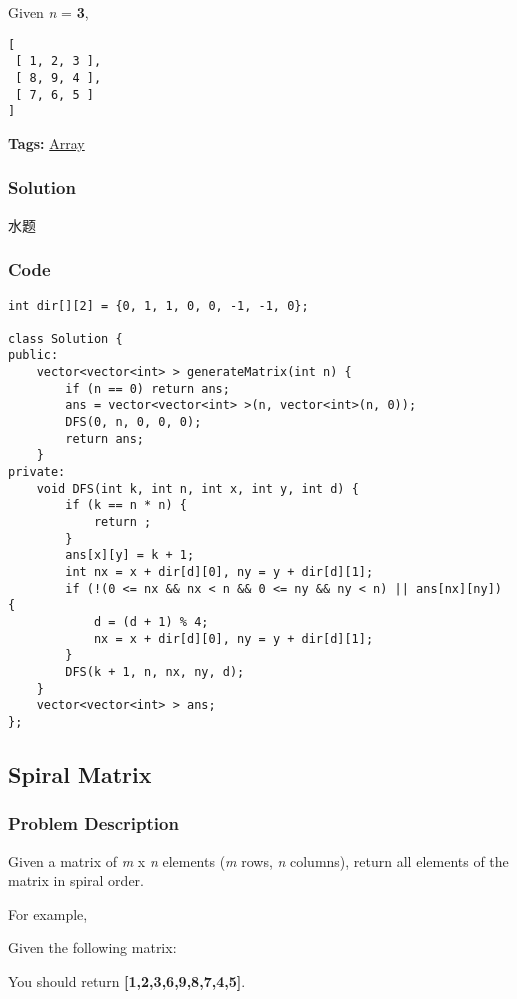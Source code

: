\documentclass{article}
\begin{document}
\begin{CJK*}{UTF8}{gkai}
Given \emph{n} = \textbf{3},

\begin{verbatim}
[
 [ 1, 2, 3 ],
 [ 8, 9, 4 ],
 [ 7, 6, 5 ]
]
\end{verbatim}

\textbf{Tags: }
\hyperref[ Array ]{ Array }



\subsubsection*{Solution}
水题

\subsubsection*{Code}
\begin{lstlisting}
int dir[][2] = {0, 1, 1, 0, 0, -1, -1, 0};

class Solution {
public:
    vector<vector<int> > generateMatrix(int n) {
        if (n == 0) return ans;
        ans = vector<vector<int> >(n, vector<int>(n, 0));
        DFS(0, n, 0, 0, 0);
        return ans;
    }
private:
    void DFS(int k, int n, int x, int y, int d) {
        if (k == n * n) {
            return ;
        }
        ans[x][y] = k + 1;
        int nx = x + dir[d][0], ny = y + dir[d][1];
        if (!(0 <= nx && nx < n && 0 <= ny && ny < n) || ans[nx][ny]) {
            d = (d + 1) % 4;
            nx = x + dir[d][0], ny = y + dir[d][1];
        }
        DFS(k + 1, n, nx, ny, d);
    }
    vector<vector<int> > ans;
};

\end{lstlisting}


\subsection{ Spiral Matrix }
\label{ Spiral Matrix }

\subsubsection*{Problem Description}
Given a matrix of \emph{m} x \emph{n} elements (\emph{m} rows, \emph{n} columns), return all elements of the matrix in spiral order.

For example,


Given the following matrix:

You should return \textbf{[1,2,3,6,9,8,7,4,5]}.


\end{CJK*}
\end{document}
